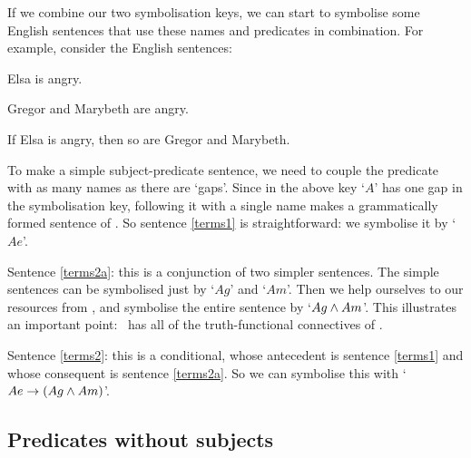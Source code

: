 If we combine our two symbolisation keys, we can start to symbolise some English sentences that use these names and predicates in combination. For example, consider the English sentences:
	\begin{earg}
		\item[\ex{terms1}] Elsa is angry.
		\item[\ex{terms2a}] Gregor and Marybeth are angry.
		\item[\ex{terms2}] If Elsa is angry, then so are Gregor and Marybeth.
	\end{earg}
To make a simple subject-predicate sentence, we need to couple the predicate with as many names as there are `gaps'. Since in the above key `$A$' has one gap in the symbolisation key, following it with a single name makes a grammatically formed sentence of \FOL. So sentence \ref{terms1} is straightforward: we symbolise it by `$Ae$'.

Sentence \ref{terms2a}: this is a conjunction of two simpler sentences. The simple sentences can be symbolised just by `$Ag$' and `$Am$'. Then we help ourselves to our resources from \TFL, and symbolise the entire sentence by `$Ag \wedge Am$'. This illustrates an important point: \FOL\ has all of the truth-functional connectives of \TFL.

Sentence \ref{terms2}: this is a conditional, whose antecedent is sentence \ref{terms1} and whose consequent is sentence \ref{terms2a}. So we can symbolise this with `$Ae \rightarrow (Ag \wedge Am)$'.

\subsection{Predicates without subjects} \label{s:zpp}

